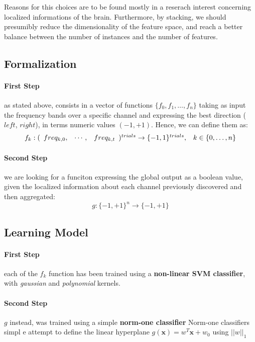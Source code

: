 \documentclass[10pt]{article}
\begin{document}
Reasons for this choices are to be found mostly in a reserach interest concerning localized informations of the brain.
Furthermore, by stacking, we should presumibly
reduce the dimensionality of the feature space, and reach a better balance between the number of instances and the number of features.

\subsection{Formalization} 

\paragraph{First Step} as stated above, consists in a vector of functions
$ \{f_0, f_1, \dots, f_n \}$ 
taking as input the frequency bands over a specific channel and expressing the best direction ($left$, $right$), in terms numeric values $(-1, +1)$. Hence, we can define them as:
$$
\begin{array}{lr}
f_k: (\begin{array}{l l l} freq_{k, 0}, & \cdots, & freq_{k, t} \end{array})^{trials} \to \{-1, 1\}^{trials},
&
k \in \{0, \dots, n\}
\end{array}
$$ 

\paragraph{Second Step} we are looking for a funciton expressing the global output as a boolean value, given the localized information about each channel previously discovered and then aggregated:
$$
g: \{-1, +1\}^n \to \{-1, +1\}
$$


\subsection{Learning Model}
\label{learning_model}

\paragraph{First Step} each of the ${f_k}$ function has been trained using a \textbf{non-linear SVM classifier}, with \emph{gaussian} and \emph{polynomial} kernels. 

\paragraph{Second Step} $g$ instead, was trained using a simple \textbf{norm-one classifier}
Norm-one classifiers simpl
e attempt to define the linear hyperplane 
$g(\boldsymbol{x}) = w^T\boldsymbol{x} + w_0$ using $||w||_1$
\end{document}
